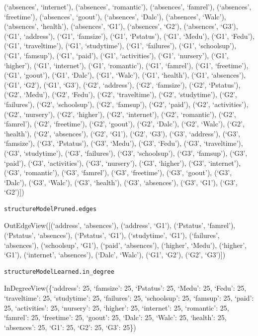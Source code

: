 \documentclass[
]{article}
\begin{document}
(`absences', `internet'), (`absences', `romantic'), (`absences',
`famrel'), (`absences', `freetime'), (`absences', `goout'), (`absences',
`Dalc'), (`absences', `Walc'), (`absences', `health'), (`absences',
`G1'), (`absences', `G2'), (`absences', `G3'), (`G1', `address'), (`G1',
`famsize'), (`G1', `Pstatus'), (`G1', `Medu'), (`G1', `Fedu'), (`G1',
`traveltime'), (`G1', `studytime'), (`G1', `failures'), (`G1',
`schoolsup'), (`G1', `famsup'), (`G1', `paid'), (`G1', `activities'),
(`G1', `nursery'), (`G1', `higher'), (`G1', `internet'), (`G1',
`romantic'), (`G1', `famrel'), (`G1', `freetime'), (`G1', `goout'),
(`G1', `Dalc'), (`G1', `Walc'), (`G1', `health'), (`G1', `absences'),
(`G1', `G2'), (`G1', `G3'), (`G2', `address'), (`G2', `famsize'), (`G2',
`Pstatus'), (`G2', `Medu'), (`G2', `Fedu'), (`G2', `traveltime'), (`G2',
`studytime'), (`G2', `failures'), (`G2', `schoolsup'), (`G2', `famsup'),
(`G2', `paid'), (`G2', `activities'), (`G2', `nursery'), (`G2',
`higher'), (`G2', `internet'), (`G2', `romantic'), (`G2', `famrel'),
(`G2', `freetime'), (`G2', `goout'), (`G2', `Dalc'), (`G2', `Walc'),
(`G2', `health'), (`G2', `absences'), (`G2', `G1'), (`G2', `G3'), (`G3',
`address'), (`G3', `famsize'), (`G3', `Pstatus'), (`G3', `Medu'), (`G3',
`Fedu'), (`G3', `traveltime'), (`G3', `studytime'), (`G3', `failures'),
(`G3', `schoolsup'), (`G3', `famsup'), (`G3', `paid'), (`G3',
`activities'), (`G3', `nursery'), (`G3', `higher'), (`G3', `internet'),
(`G3', `romantic'), (`G3', `famrel'), (`G3', `freetime'), (`G3',
`goout'), (`G3', `Dalc'), (`G3', `Walc'), (`G3', `health'), (`G3',
`absences'), (`G3', `G1'), (`G3', `G2'){]})

\begin{verbatim}
structureModelPruned.edges
\end{verbatim}

OutEdgeView({[}(`address', `absences'), (`address', `G1'), (`Pstatus',
`famrel'), (`Pstatus', `absences'), (`Pstatus', `G1'), (`studytime',
`G1'), (`failures', `absences'), (`schoolsup', `G1'), (`paid',
`absences'), (`higher', `Medu'), (`higher', `G1'), (`internet',
`absences'), (`Dalc', `Walc'), (`G1', `G2'), (`G2', `G3'){]})

\begin{verbatim}
structureModelLearned.in_degree
\end{verbatim}

InDegreeView(\{`address': 25, `famsize': 25, `Pstatus': 25, `Medu': 25,
`Fedu': 25, `traveltime': 25, `studytime': 25, `failures': 25,
`schoolsup': 25, `famsup': 25, `paid': 25, `activities': 25, `nursery':
25, `higher': 25, `internet': 25, `romantic': 25, `famrel': 25,
`freetime': 25, `goout': 25, `Dalc': 25, `Walc': 25, `health': 25,
`absences': 25, `G1': 25, `G2': 25, `G3': 25\})
\end{document}

